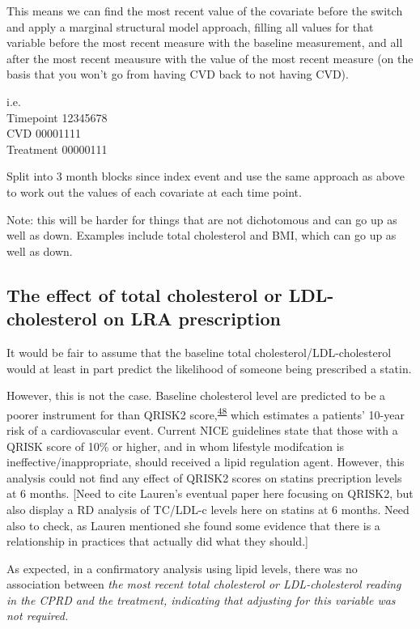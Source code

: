 \documentclass[a4paper, twoside]{templates/ociamthesis}
\begin{document}
This means we can find the most recent value of the covariate before the switch and apply a marginal structural model approach, filling all values for that variable before the most recent measure with the baseline measurement, and all after the most recent meausure with the value of the most recent measure (on the basis that you won't go from having CVD back to not having CVD).

i.e.\\
Timepoint 12345678\\
CVD 00001111\\
Treatment 00000111

Split into 3 month blocks since index event and use the same approach as above to work out the values of each covariate at each time point.

Note: this will be harder for things that are not dichotomous and can go up as well as down. Examples include total cholesterol and BMI, which can go up as well as down.

\hypertarget{the-effect-of-total-cholesterol-or-ldl-cholesterol-on-lra-prescription}{%
\subsection{The effect of total cholesterol or LDL-cholesterol on LRA prescription}\label{the-effect-of-total-cholesterol-or-ldl-cholesterol-on-lra-prescription}}

It would be fair to assume that the baseline total cholesterol/LDL-cholesterol would at least in part predict the likelihood of someone being prescribed a statin.

However, this is not the case. Baseline cholesterol level are predicted to be a poorer instrument for than QRISK2 score,\textsuperscript{\protect\hyperlink{ref-hippisley-cox2008}{48}} which estimates a patients' 10-year risk of a cardiovascular event. Current NICE guidelines state that those with a QRISK score of 10\% or higher, and in whom lifestyle modifcation is ineffective/inappropriate, should received a lipid regulation agent. However, this analysis could not find any effect of QRISK2 scores on statins precription levels at 6 months. {[}Need to cite Lauren's eventual paper here focusing on QRISK2, but also display a RD analysis of TC/LDL-c levels here on statins at 6 months. Need also to check, as Lauren mentioned she found some evidence that there is a relationship in practices that actually did what they should.{]}

As expected, in a confirmatory analysis using lipid levels, there was no association between \emph{the most recent total cholesterol or LDL-cholesterol reading in the CPRD and the treatment, indicating that adjusting for this variable was not required.}
\end{document}
